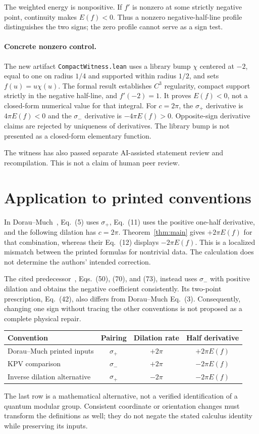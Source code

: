 \documentclass[11pt]{article}
\begin{document}
The weighted energy is nonpositive. If $f'$ is nonzero at some strictly negative point, continuity makes $E(f)<0$. Thus a nonzero negative-half-line profile distinguishes the two signs; the zero profile cannot serve as a sign test.

\paragraph{Concrete nonzero control.}
The new artifact \texttt{CompactWitness.lean} uses a library bump $\chi$ centered at $-2$, equal to one on radius $1/4$ and supported within radius $1/2$, and sets $f(u)=u\chi(u)$. The formal result establishes $C^3$ regularity, compact support strictly in the negative half-line, and $f'(-2)=1$. It proves $E(f)<0$, not a closed-form numerical value for that integral. For $c=2\pi$, the $\sigma_+$ derivative is $4\pi E(f)<0$ and the $\sigma_-$ derivative is $-4\pi E(f)>0$. Opposite-sign derivative claims are rejected by uniqueness of derivatives. The library bump is not presented as a closed-form elementary function.

The witness has also passed separate AI-assisted statement review and recompilation. This is not a claim of human peer review.

\section{Application to printed conventions}
In Dorau--Much~\cite{DM}, Eq.~(5) uses $\sigma_+$, Eq.~(11) uses the positive one-half derivative, and the following dilation has $c=2\pi$. Theorem~\ref{thm:main} gives $+2\pi E(f)$ for that combination, whereas their Eq.~(12) displays $-2\pi E(f)$. This is a localized mismatch between the printed formulas for nontrivial data. The calculation does not determine the authors' intended correction.

The cited predecessor~\cite{KPV}, Eqs.~(50), (70), and (73), instead uses $\sigma_-$ with positive dilation and obtains the negative coefficient consistently. Its two-point prescription, Eq.~(42), also differs from Dorau--Much Eq.~(3). Consequently, changing one sign without tracing the other conventions is not proposed as a complete physical repair.

\begin{center}
\begin{tabular}{lccc}
\toprule
Convention & Pairing & Dilation rate & Half derivative\\
\midrule
Dorau--Much printed inputs & $\sigma_+$ & $+2\pi$ & $+2\pi E(f)$\\
KPV comparison & $\sigma_-$ & $+2\pi$ & $-2\pi E(f)$\\
Inverse dilation alternative & $\sigma_+$ & $-2\pi$ & $-2\pi E(f)$\\
\bottomrule
\end{tabular}
\end{center}
The last row is a mathematical alternative, not a verified identification of a quantum modular group. Consistent coordinate or orientation changes must transform the definitions as well; they do not negate the stated calculus identity while preserving its inputs.
\end{document}
